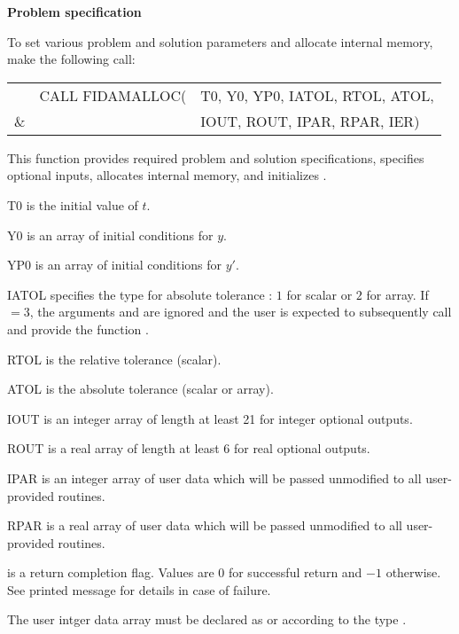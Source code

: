 \begin{Steps}
\item {\bf Problem specification}

  To set various problem and solution parameters and allocate
  internal memory, make the following call:
  {
    \begin{tabular}[t]{@{}r@{}l@{}l}
        &CALL FIDAMALLOC(&T0, Y0, YP0, IATOL, RTOL, ATOL,  \\
    {\&}&                &IOUT, ROUT, IPAR, RPAR, IER)
  \end{tabular}
  }
  {
    This function provides required problem and solution specifications, 
    specifies optional inputs,
    allocates internal memory, and initializes {\ida}.
  }
  {
    \begin{args}[IATOL]
    \item[T0] is the initial value of $t$.
    \item[Y0] is an array of initial conditions for $y$.
    \item[YP0] is an array of initial conditions for $y'$.
    \item[IATOL] specifies the type for absolute tolerance :
      $1$ for scalar or $2$ for array. If $=3$, the arguments
       and  are ignored and the user is expected to
      subsequently call  and provide the function .
    \item[RTOL] is the relative tolerance (scalar).
    \item[ATOL] is the absolute tolerance (scalar or array).
    \item[IOUT] is an integer array of length at least 21 for integer optional
                outputs.
    \item[ROUT] is a real array of length at least 6 for real optional outputs.
    \item[IPAR] is an integer array of user data which will be passed
      unmodified to all user-provided routines.
    \item[RPAR] is a real array of user data which will be passed
      unmodified to all user-provided routines.
    \end{args}
  }
  {
     is a return completion flag.  Values are $0$ for successful return
    and $-1$ otherwise. See printed message for details in case of failure.
  }
  {
    The user intger data array  must be declared as  or 
     according to the {\C} type .

}
\end{Steps}
